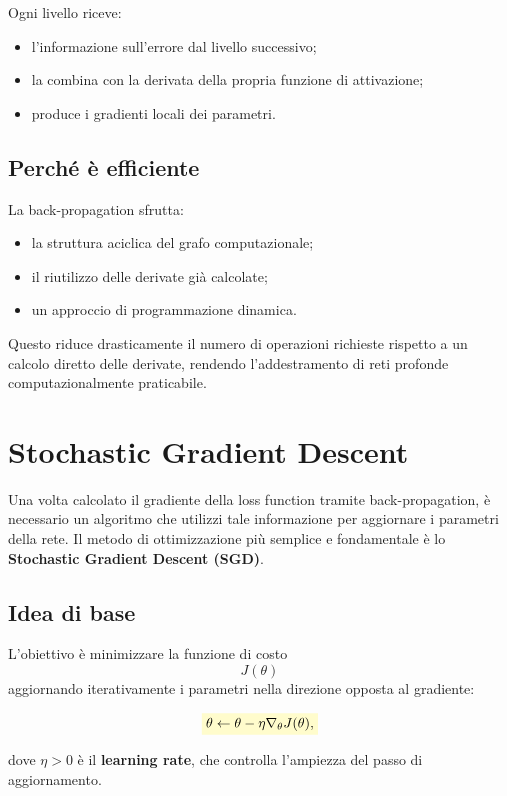 \documentclass[a4paper,12pt]{report}
\newcommand{\highlight}[1]{%
\colorbox{yellow!20}{$\displaystyle #1$}%
}
\begin{document}
Ogni livello riceve:
\begin{itemize}
    \item l’informazione sull’errore dal livello successivo;
    \item la combina con la derivata della propria funzione di attivazione;
    \item produce i gradienti locali dei parametri.
\end{itemize}

\subsection{Perché è efficiente}

La back-propagation sfrutta:
\begin{itemize}
    \item la struttura aciclica del grafo computazionale;
    \item il riutilizzo delle derivate già calcolate;
    \item un approccio di programmazione dinamica.
\end{itemize}

Questo riduce drasticamente il numero di operazioni richieste rispetto a un calcolo diretto delle derivate, rendendo l’addestramento di reti profonde computazionalmente praticabile.

\section{Stochastic Gradient Descent}

Una volta calcolato il gradiente della loss function tramite back-propagation, è necessario un algoritmo che utilizzi tale informazione per aggiornare i parametri della rete.  
Il metodo di ottimizzazione più semplice e fondamentale è lo \textbf{Stochastic Gradient Descent (SGD)}.

\subsection{Idea di base}

L’obiettivo è minimizzare la funzione di costo
\[
J(\theta)
\]
aggiornando iterativamente i parametri nella direzione opposta al gradiente:

\[
\highlight{
\theta \leftarrow \theta - \eta \nabla_{\theta} J(\theta),}
\]

dove $\eta > 0$ è il \textbf{learning rate}, che controlla l’ampiezza del passo di aggiornamento.
\end{document}
